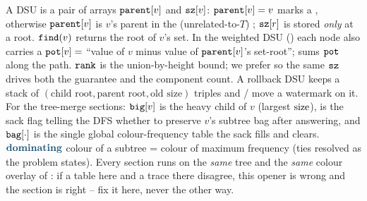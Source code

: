A DSU is a pair of arrays \(\texttt{parent}[v]\) and \(\texttt{sz}[v]\):
\(\texttt{parent}[v]=v\) marks a , otherwise \(\texttt{parent}[v]\) is
\(v\)'s parent in the (unrelated-to-\(T\)) ; \(\texttt{sz}[r]\)
is stored \emph{only} at a root.  \(\texttt{find}(v)\) returns the root of
\(v\)'s set.  In the weighted DSU () each node also
carries a  \(\texttt{pot}[v] = \) ``value of \(v\) minus value of
\(\texttt{parent}[v]\)'s set-root'';  sums \(\texttt{pot}\) along the path.
\(\texttt{rank}\) is the union-by-height bound; we prefer  so
the same \(\texttt{sz}\) drives both the guarantee and the component count.  A
rollback DSU keeps a stack of \((\text{child root}, \text{parent root},
\text{old size})\) triples and / move a
watermark on it.  For the tree-merge sections: \(\texttt{big}[v]\) is the heavy
child of \(v\) (largest \(\operatorname{size}\)),  is the sack flag telling the
DFS whether to preserve \(v\)'s subtree bag after answering, and
\(\texttt{bag}[\cdot]\) is the single global colour-frequency table the sack fills and
clears.  \(\term{dominating}\) colour of a subtree = colour of maximum
frequency (ties resolved as the problem states).  Every section runs on the
\emph{same} tree and the \emph{same} colour overlay of : if a
table here and a trace there disagree, this opener is wrong and the section is
right -- fix it here, never the other way.
